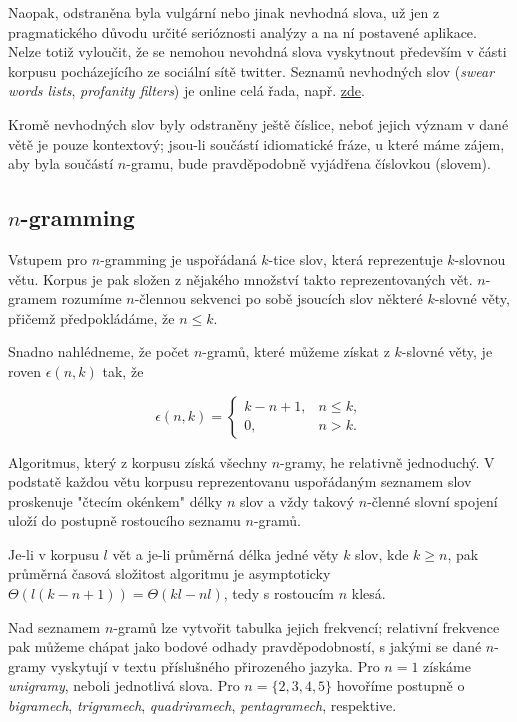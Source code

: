 Naopak, odstraněna byla vulgární nebo jinak nevhodná slova, už jen z pragmatického důvodu určité serióznosti analýzy a na ní postavené aplikace. Nelze totiž vyloučit, že se nemohou nevohdná slova vyskytnout především v části korpusu pocházejícího ze sociální sítě \textsf{twitter}. Seznamů nevhodných slov (\textit{swear words lists}, \textit{profanity filters}) je online celá řada, např. \href{http://www.bannedwordlist.com/}{zde}.

Kromě nevhodných slov byly odstraněny ještě číslice, neboť jejich význam v dané větě je pouze kontextový; jsou-li součástí idiomatické fráze, u které máme zájem, aby byla součástí $n$-gramu, bude pravděpodobně vyjádřena číslovkou (slovem).



\subsection{$n$-gramming}

Vstupem pro $n$-gramming je uspořádaná $k$-tice slov, která reprezentuje $k$-slovnou větu. Korpus je pak složen z nějakého množství takto reprezentovaných vět. $n$-gramem rozumíme $n$-člennou sekvenci po sobě jsoucích slov některé $k$-slovné věty, přičemž předpokládáme, že $n \leq k$.

Snadno nahlédneme, že počet $n$-gramů, které můžeme získat z $k$-slovné věty, je roven $\epsilon(n, k)$ tak, že

\begin{equation*}
  \epsilon(n, k) = \left\{
  \begin{array}{rr}
  k - n + 1,  & n \leq k, \\
          0,  & n > k.
  \end{array} \right.
\end{equation*}

Algoritmus, který z korpusu získá všechny $n$-gramy, he relativně jednoduchý. V podstatě každou větu korpusu reprezentovanu uspořádaným seznamem slov proskenuje "čtecím okénkem" délky $n$ slov a vždy takový $n$-členné slovní spojení uloží do postupně rostoucího seznamu $n$-gramů.

Je-li v korpusu $l$ vět a je-li průměrná délka jedné věty $k$ slov, kde $k \geq n$, pak průměrná časová složitost algoritmu je asymptoticky $\Theta(l(k - n + 1)) = \Theta(kl-nl)$, tedy s rostoucím $n$ klesá.

Nad seznamem $n$-gramů lze vytvořit tabulka jejich frekvencí; relativní frekvence pak můžeme chápat jako bodové odhady pravděpodobností, s jakými se dané $n$-gramy vyskytují v textu příslušného přirozeného jazyka. Pro $n = 1$ získáme \textit{unigramy}, neboli jednotlivá slova. Pro $n = \{2, 3, 4, 5\}$ hovoříme postupně o \textit{bigramech}, \textit{trigramech}, \textit{quadriramech}, \textit{pentagramech}, respektive.

